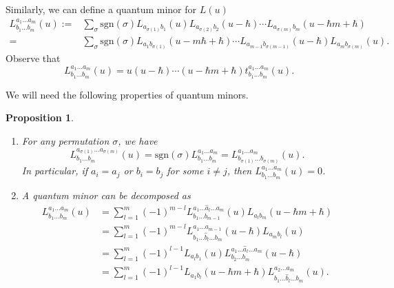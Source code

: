 \documentclass[10pt,a4paper]{article}
\numberwithin{equation}{section}
\newtheorem{Proposition}[Theorem]{Proposition}
{ \theoremstyle{definition}
	\newtheorem{Definition}[Theorem]{Definition}
	\newtheorem{Note}[Theorem]{Note}
	\newtheorem{Example}[Theorem]{Example}
	\newtheorem{Remark}[Theorem]{Remark} }
\begin{document}
	Similarly, we can define a quantum minor for $L(u)$
	\begin{align}
			L_{b_1\dots b_m}^{a_1\dots a_m}(u) :={} & \sum\limits_{\sigma} \mathrm{sgn}(\sigma) L_{a_{\sigma(1)}b_1} (u) L_{a_{\sigma(2)} b_2} (u-\hbar) \cdots L_{a_{\sigma(m)} b_m} (u-\hbar m + \hbar)\nonumber \\
			={} & \sum\limits_{\sigma} \mathrm{sgn}(\sigma) L_{a_1 b_{\sigma(1)}}(u-m\hbar+\hbar)\cdots L_{a_{m-1} b_{\sigma(m-1)}} (u-\hbar) L_{a_m b_{\sigma(m)}}(u).		\label{eq::quantum_minor}
	\end{align}
	Observe that
	\begin{equation}
		\label{eq::t_l_minor_relation}
		L_{b_1\dots b_m}^{a_1\dots a_m}(u) = u(u-\hbar)\cdots (u-\hbar m + \hbar)t_{b_1\dots b_m}^{a_1\dots a_m}(u).
	\end{equation}
	
	We will need the following properties of quantum minors.
	\begin{Proposition}\qquad
		\label{prop::minor_basic}
		\begin{enumerate}\itemsep=0pt
			\item[$(1)$]\label{prop::minor_basic_perm} For any permutation $\sigma$, we have
			\[
			L_{b_1\dots b_m}^{a_{\sigma(1)}\dots a_{\sigma(m)}}(u) = \mathrm{sgn}(\sigma) L_{b_1\dots b_m}^{a_1 \dots a_m} = L_{b_{\sigma(1)} \dots b_{\sigma(m)}}^{a_1\dots a_m}(u).
			\]
			In particular, if $a_i = a_j$ or $b_i=b_j$ for some $i\neq j$, then $L_{b_1\dots b_m}^{a_1 \dots a_m} (u) = 0$.
			\item[$(2)$]\label{prop::minor_basic_sum} A quantum minor can be decomposed as {\rm\cite[\emph{Proposition} 1.6.8]{MolevYangians}}
			\begin{align*}
				L_{b_1 \dots b_m}^{a_1 \dots a_m}(u)& =\sum\limits_{l=1}^m (-1)^{m-l} L_{b_1 \dots b_{m-1}}^{a_1 \dots \hat{a}_l \dots a_m}(u) L_{a_l b_m}(u-\hbar m + \hbar) \\
				&= \sum\limits_{l=1}^m (-1)^{m-l} L_{b_1\dots \hat{b}_l \dots b_m}^{a_1\dots a_{m-1}}(u-\hbar) L_{a_m b_l}(u) \\
				&= \sum\limits_{l=1}^m (-1)^{l-1} L_{a_l b_1} (u) L_{b_2\dots b_m}^{a_1 \dots \hat{a}_l \dots a_m} (u-\hbar) \\
				&= \sum\limits_{l=1}^m (-1)^{l-1} L_{a_1 b_l}(u-\hbar m + \hbar) L_{b_1 \dots \hat{b}_l \dots b_m}^{a_2 \dots a_m}(u).
			\end{align*}
		\end{enumerate}
	\end{Proposition}
	
\end{document}
